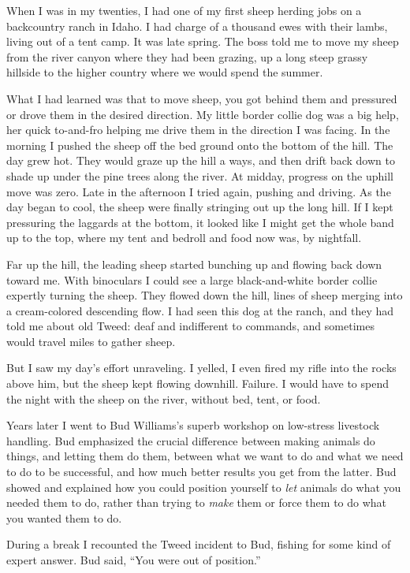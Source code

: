 \documentclass[11pt,letterpaper,twoside,onecolumn]{memoir}
\begin{document}
When I was in my twenties, I had one of my first sheep herding jobs on a backcountry ranch in Idaho. I had charge of a thousand ewes with their lambs, living out of a tent camp. It was late spring. The boss told me to move my sheep from the river canyon where they had been grazing, up a long steep grassy hillside to the higher country where we would spend the summer.

What I had learned was that to move sheep, you got behind them and pressured or drove them in the desired direction. My little border collie dog was a big help, her quick to-and-fro helping me drive them in the direction I was facing. In the morning I pushed the sheep off the bed ground onto the bottom of the hill. The day grew hot. They would graze up the hill a ways, and then drift back down to shade up under the pine trees along the river. At midday, progress on the uphill move was zero. Late in the afternoon I tried again, pushing and driving. As the day began to cool, the sheep were finally stringing out up the long hill. If I kept pressuring the laggards at the bottom, it looked like I might get the whole band up to the top, where my tent and bedroll and food now was, by nightfall.

Far up the hill, the leading sheep started bunching up and flowing back down toward me. With binoculars I could see a large black-and-white border collie expertly turning the sheep. They flowed down the hill, lines of sheep merging into a cream-colored descending flow. I had seen this dog at the ranch, and they had told me about old Tweed: deaf and indifferent to commands, and sometimes would travel miles to gather sheep.

But I saw my day's effort unraveling. I yelled, I even fired my rifle into the rocks above him, but the sheep kept flowing downhill. Failure. I would have to spend the night with the sheep on the river, without bed, tent, or food.

Years later I went to Bud Williams's superb workshop on low-stress livestock handling. Bud emphasized the crucial difference between making animals do things, and letting them do them, between what we want to do and what we need to do to be successful, and how much better results you get from the latter. Bud showed and explained how you could position yourself to \textit{let} animals do what you needed them to do, rather than trying to \textit{make} them or force them to do what you wanted them to do.

During a break I recounted the Tweed incident to Bud, fishing for some kind of expert answer. Bud said, ``You were out of position.''
\end{document}
